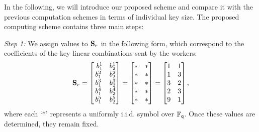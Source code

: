 \documentclass[conference,letterpaper]{IEEEtran}
\begin{document}
\begin{example}
In the following, we will introduce our proposed scheme and compare it with the previous computation schemes in terms of individual key size. The proposed computing scheme contains three main steps:

{\it Step 1:}  
We assign values to ${\bf S}_r$ in the following form, which correspond to the coefficients of the key linear combinations sent by the workers:  
\begin{align}  
{\bf S}_r = \begin{bmatrix}\   
  b^{1}_1   & b^{1}_2   \\  
  b^{2}_1   & b^{2}_2   \\  
  b^{3}_1   & b^{3}_2  \\  
  b^{4}_1   & b^{4}_2  \\ 
  b^{5}_1   & b^{5}_2
\end{bmatrix} 
=  
 \begin{bmatrix}    
  * & *  \\  
  * & *  \\  
  * & *  \\  
  * & *  \\  
  * & *   
\end{bmatrix}  
=  
 \begin{bmatrix}    
  1 & 1 \\  
  1 & 3 \\  
  3 & 2 \\  
  2 & 3 \\
  9 & 1 
\end{bmatrix},\label{eq:example S4 assignment}  
\end{align}  
where each `$*$' represents a uniformly i.i.d. symbol over $\mathbb{F}_{{\sf q}}$. Once these values are determined, they remain fixed.  


\end{example}
\end{document}
